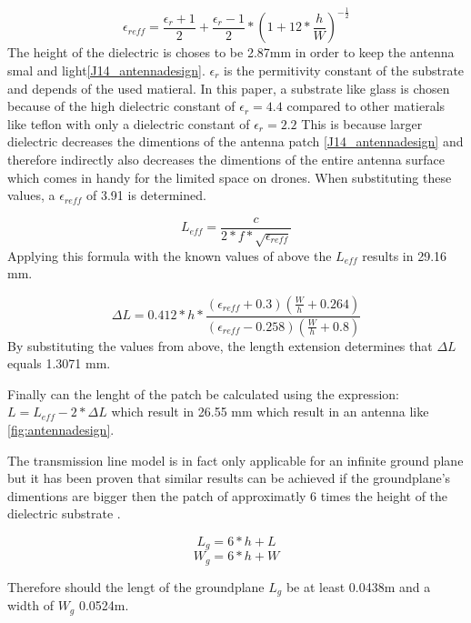 $$\epsilon_{reff} = \frac{\epsilon_r+1}{2}+  \frac{\epsilon_r-1}{2} * \left(1+12*\frac{h}{W}\right)^{-\frac{1}{2}}$$
The height of the dielectric is choses to be 2.87mm in order to keep the antenna smal and light\ref{J14_antennadesign}.
$\epsilon_r$ is the permitivity constant of the substrate and depends of the used matieral. In this paper, a substrate like glass is chosen because of the high dielectric constant of $\epsilon_r = 4.4$ compared to other matierals like teflon with only a dielectric constant of $\epsilon_r = 2.2$
This is because larger dielectric decreases the dimentions of the antenna patch \ref{J14_antennadesign} and therefore indirectly also decreases the dimentions of the entire antenna surface which comes in handy for the limited space on drones. When substituting these values, a $\epsilon_{reff}$ of 3.91 is determined.

\begin{equation} 
L_{eff} = \frac{c}{2*f*\sqrt{\epsilon_{reff}}}
\end{equation}
Applying this formula with the known values of above the $L_{eff}$ results in 29.16 mm.

\begin{equation} 
\Delta L = 0.412*h*\frac{(\epsilon_{reff}+0.3)\left(\frac{W}{h}+0.264\right)}{\left(\epsilon_{reff}-0.258\right)\left(\frac{W}{h}+0.8\right)}
\end{equation}
By substituting the values from above, the length extension determines that $\Delta L$ equals 1.3071 mm.

Finally can the lenght of the patch be calculated using the expression: $L = L_{eff} - 2 * \Delta L$
which result in 26.55 mm which result in an antenna like \ref{fig:antennadesign}.

The transmission line model is in fact only applicable for an infinite ground plane but it has been proven that similar results
can be achieved if the groundplane's dimentions are bigger then the patch of approximatly 6 times the height of the dielectric substrate \cite{J14_antennadesign,J15_antennadesign}.

\begin{equation} 
L_{g} = 6 * h + L
\end{equation}
\begin{equation} 
W_{g} = 6 * h + W
\end{equation}

Therefore should the lengt of the groundplane $L_{g}$ be at least 0.0438m and a width of $W_{g}$ 0.0524m.

